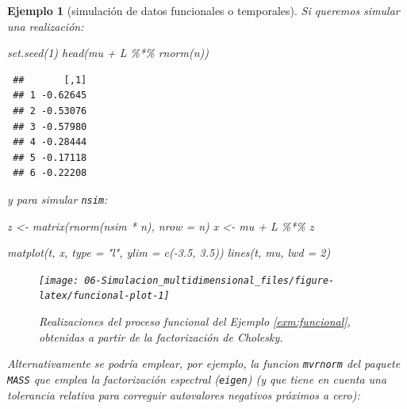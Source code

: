\documentclass[
  10pt,
]{book}
\newenvironment{Shaded}{\begin{snugshade}}{\end{snugshade}}
\newcommand{\AttributeTok}[1]{\textcolor[rgb]{0.77,0.63,0.00}{#1}}
\newcommand{\DecValTok}[1]{\textcolor[rgb]{0.00,0.00,0.81}{#1}}
\newcommand{\FloatTok}[1]{\textcolor[rgb]{0.00,0.00,0.81}{#1}}
\newcommand{\FunctionTok}[1]{\textcolor[rgb]{0.00,0.00,0.00}{#1}}
\newcommand{\NormalTok}[1]{#1}
\newcommand{\OtherTok}[1]{\textcolor[rgb]{0.56,0.35,0.01}{#1}}
\newcommand{\SpecialCharTok}[1]{\textcolor[rgb]{0.00,0.00,0.00}{#1}}
\newcommand{\StringTok}[1]{\textcolor[rgb]{0.31,0.60,0.02}{#1}}
\theoremstyle{break}
\newtheorem{example}{Ejemplo}[chapter]
\theoremstyle{nonumberplain}
\begin{document}
\begin{example}[simulación de datos funcionales o temporales]
Si queremos simular una realización:

\begin{Shaded}
\begin{Highlighting}[]
\FunctionTok{set.seed}\NormalTok{(}\DecValTok{1}\NormalTok{)}
\FunctionTok{head}\NormalTok{(mu }\SpecialCharTok{+}\NormalTok{ L }\SpecialCharTok{\%*\%} \FunctionTok{rnorm}\NormalTok{(n))}
\end{Highlighting}
\end{Shaded}

\begin{verbatim}
 ##       [,1]
 ## 1 -0.62645
 ## 2 -0.53076
 ## 3 -0.57980
 ## 4 -0.28444
 ## 5 -0.17118
 ## 6 -0.22208
\end{verbatim}

y para simular \texttt{nsim}:



\begin{Shaded}
\begin{Highlighting}[]
\NormalTok{z }\OtherTok{\textless{}{-}} \FunctionTok{matrix}\NormalTok{(}\FunctionTok{rnorm}\NormalTok{(nsim }\SpecialCharTok{*}\NormalTok{ n), }\AttributeTok{nrow =}\NormalTok{ n)}
\NormalTok{x }\OtherTok{\textless{}{-}}\NormalTok{ mu }\SpecialCharTok{+}\NormalTok{ L }\SpecialCharTok{\%*\%}\NormalTok{ z}

\FunctionTok{matplot}\NormalTok{(t, x, }\AttributeTok{type =} \StringTok{"l"}\NormalTok{, }\AttributeTok{ylim =} \FunctionTok{c}\NormalTok{(}\SpecialCharTok{{-}}\FloatTok{3.5}\NormalTok{, }\FloatTok{3.5}\NormalTok{))}
\FunctionTok{lines}\NormalTok{(t, mu, }\AttributeTok{lwd =} \DecValTok{2}\NormalTok{)}
\end{Highlighting}
\end{Shaded}

\begin{figure}[!htbp]

{\centering \texttt{[image: 06-Simulacion\_multidimensional\_files/figure-latex/funcional-plot-1]} 

}

\caption{Realizaciones del proceso funcional del Ejemplo \ref{exm:funcional}, obtenidas a partir de la factorización de Cholesky.}\label{fig:funcional-plot}
\end{figure}

Alternativamente se podría emplear, por ejemplo, la funcion \texttt{mvrnorm}
del paquete \texttt{MASS} que emplea la factorización espectral (\texttt{eigen}) (y que tiene en cuenta una tolerancia relativa para correguir autovalores negativos próximos a cero):




\end{example}
\end{document}
